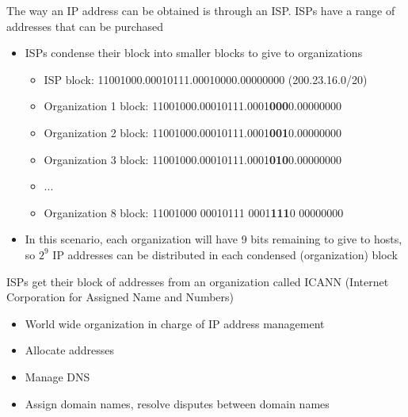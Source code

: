 \documentclass{article}
\begin{document}
The way an IP address can be obtained is through an ISP. ISPs have a range of addresses that can be
purchased
\begin{itemize}
    \item ISPs condense their block into smaller blocks to give to organizations
    \begin{itemize}
        \item ISP block: 11001000.00010111.00010000.00000000 (200.23.16.0/20)
        \item Organization 1 block: 11001000.00010111.0001\textbf{000}0.00000000
        \item Organization 2 block: 11001000.00010111.0001\textbf{001}0.00000000
        \item Organization 3 block: 11001000.00010111.0001\textbf{010}0.00000000
        \item ...
        \item Organization 8 block: 11001000 00010111 0001\textbf{111}0 00000000
    \end{itemize}
    \item In this scenario, each organization will have 9 bits remaining to give to hosts, so 
    $2^9$ IP addresses can be distributed in each condensed (organization) block
\end{itemize}
ISPs get their block of addresses from an organization called ICANN (Internet Corporation for Assigned
Name and Numbers)
\begin{itemize}
    \item World wide organization in charge of IP address management
    \item Allocate addresses
    \item Manage DNS 
    \item Assign domain names, resolve disputes between domain names
\end{itemize}
\newpage

\end{document}
